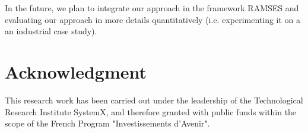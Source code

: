 \documentclass[conference]{IEEEtran}
\begin{document}
In the future, we plan to integrate our approach in the framework RAMSES and evaluating our approach in more details quantitatively (i.e. experimenting it on a an industrial case study)\cite{greg}.



\section{Acknowledgment}
This research work has been carried out under the leadership of the Technological Research Institute SystemX, and therefore granted with public funds within the scope of the French Program "Investissements d’Avenir".
\end{document}
